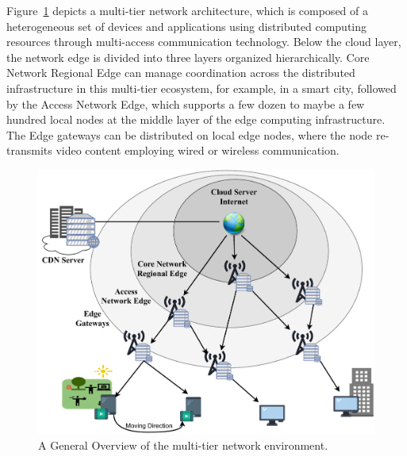 Figure~\ref{fig:multi-tier-network} depicts a multi-tier network architecture, which is composed of a heterogeneous set of devices and applications using distributed computing resources through multi-access communication technology. Below the cloud layer, the network edge is divided into three layers organized hierarchically. Core Network Regional Edge can manage coordination across the distributed infrastructure in this multi-tier ecosystem, for example, in a smart city, followed by the Access Network Edge, which supports a few dozen to maybe a few hundred local nodes at the middle layer of the edge computing infrastructure. The Edge gateways can be distributed on local edge nodes, where the node re-transmits video content employing wired or wireless communication.

\begin{figure}[htb!]
    \centering
    \includegraphics[width=\linewidth]{images/arch-video-content-2.pdf}
    \caption{A General Overview of the multi-tier network environment.}
    \label{fig:multi-tier-network}
\end{figure}

%
%

